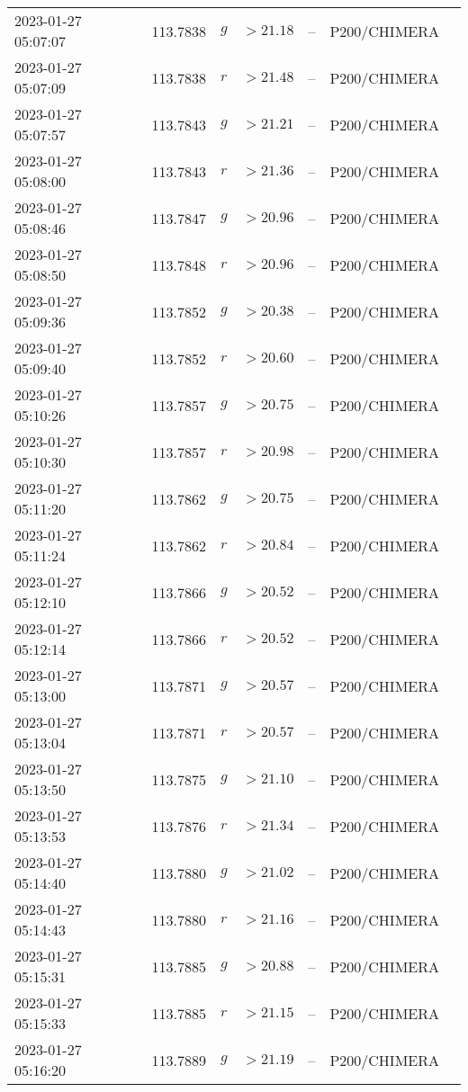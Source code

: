 \documentclass{nature_plusfigure}
\begin{document}
\begin{supplement}
\begin{center}
\begin{longtable}{lllllll}
2023-01-27 05:07:07 & 113.7838 & $g$ & $>21.18$ & -- & P200/CHIMERA &  \\ 
2023-01-27 05:07:09 & 113.7838 & $r$ & $>21.48$ & -- & P200/CHIMERA &  \\ 
2023-01-27 05:07:57 & 113.7843 & $g$ & $>21.21$ & -- & P200/CHIMERA &  \\ 
2023-01-27 05:08:00 & 113.7843 & $r$ & $>21.36$ & -- & P200/CHIMERA &  \\ 
2023-01-27 05:08:46 & 113.7847 & $g$ & $>20.96$ & -- & P200/CHIMERA &  \\ 
2023-01-27 05:08:50 & 113.7848 & $r$ & $>20.96$ & -- & P200/CHIMERA &  \\ 
2023-01-27 05:09:36 & 113.7852 & $g$ & $>20.38$ & -- & P200/CHIMERA &  \\ 
2023-01-27 05:09:40 & 113.7852 & $r$ & $>20.60$ & -- & P200/CHIMERA &  \\ 
2023-01-27 05:10:26 & 113.7857 & $g$ & $>20.75$ & -- & P200/CHIMERA &  \\ 
2023-01-27 05:10:30 & 113.7857 & $r$ & $>20.98$ & -- & P200/CHIMERA &  \\ 
2023-01-27 05:11:20 & 113.7862 & $g$ & $>20.75$ & -- & P200/CHIMERA &  \\ 
2023-01-27 05:11:24 & 113.7862 & $r$ & $>20.84$ & -- & P200/CHIMERA &  \\ 
2023-01-27 05:12:10 & 113.7866 & $g$ & $>20.52$ & -- & P200/CHIMERA &  \\ 
2023-01-27 05:12:14 & 113.7866 & $r$ & $>20.52$ & -- & P200/CHIMERA &  \\ 
2023-01-27 05:13:00 & 113.7871 & $g$ & $>20.57$ & -- & P200/CHIMERA &  \\ 
2023-01-27 05:13:04 & 113.7871 & $r$ & $>20.57$ & -- & P200/CHIMERA &  \\ 
2023-01-27 05:13:50 & 113.7875 & $g$ & $>21.10$ & -- & P200/CHIMERA &  \\ 
2023-01-27 05:13:53 & 113.7876 & $r$ & $>21.34$ & -- & P200/CHIMERA &  \\ 
2023-01-27 05:14:40 & 113.7880 & $g$ & $>21.02$ & -- & P200/CHIMERA &  \\ 
2023-01-27 05:14:43 & 113.7880 & $r$ & $>21.16$ & -- & P200/CHIMERA &  \\ 
2023-01-27 05:15:31 & 113.7885 & $g$ & $>20.88$ & -- & P200/CHIMERA &  \\ 
2023-01-27 05:15:33 & 113.7885 & $r$ & $>21.15$ & -- & P200/CHIMERA &  \\ 
2023-01-27 05:16:20 & 113.7889 & $g$ & $>21.19$ & -- & P200/CHIMERA &  \\ 

\end{longtable}
\end{center}
\end{supplement}
\end{document}
